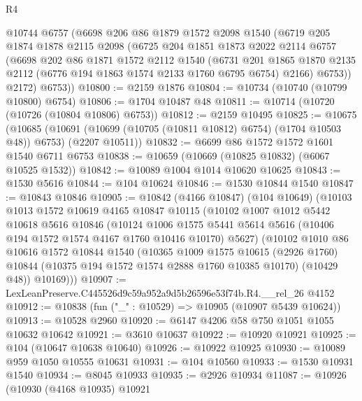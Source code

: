 \begin{lexlean}{R4}
\begin{coremodule}
      @10744
      @6757
      (@6698
        @206
        @86
        @1879
        @1572
        @2098
        @1540
        (@6719
          @205
          @1874
          @1878
          @2115
          @2098
          (@6725
            @204
            @1851
            @1873
            @2022
            @2114
            @6757
            (@6698
              @202
              @86
              @1871
              @1572
              @2112
              @1540
              (@6731
                @201
                @1865
                @1870
                @2135
                @2112
                (@6776 @194 @1863 @1574 @2133 @1760 @6795 @6754)
                @2166)
              @6753))
          @2172)
        @6753))
@10800 := @2159 @1876
@10804 := @10734 (@10740 (@10799 @10800) @6754)
@10806 := @1704 @10487 @48
@10811 := @10714 (@10720 (@10726 (@10804 @10806) @6753))
@10812 := @2159 @10495
@10825 := @10675
    (@10685
      (@10691 (@10699 (@10705 (@10811 @10812) @6754) (@1704 @10503 @48)) @6753)
      (@2207 @10511))
@10832 := @6699 @86 @1572 @1572 @1601 @1540 @6711 @6753
@10838 := @10659 (@10669 (@10825 @10832) (@6067 @10525 @1532))
@10842 := @10089 @1004 @1014 @10620 @10625
@10843 := @1530 @5616
@10844 := @104 @10624
@10846 := @1530 @10844 @1540
@10847 := @10843 @10846
@10905 := @10842
    (@4166 @10847)
    (@104 @10649)
    (@10103
      @1013
      @1572
      @10619
      @4165
      @10847
      @10115
      (@10102
        @1007
        @1012
        @5442
        @10618
        @5616
        @10846
        (@10124
          @1006
          @1575
          @5441
          @5614
          @5616
          (@10406 @194 @1572 @1574 @4167 @1760 @10416 @10170)
          @5627)
        (@10102
          @1010
          @86
          @10616
          @1572
          @10844
          @1540
          (@10365
            @1009
            @1575
            @10615
            (@2926 @1760)
            @10844
            (@10375 @194 @1572 @1574 @2888 @1760 @10385 @10170)
            (@10429 @48))
          @10169)))
@10907 := LexLeanPreserve.C445526d9c59a952a9d5b26596e53f74b.R4.__rel_26 @4152
@10912 := @10838 (fun ("_" : @10529) => @10905 (@10907 @5439 @10624))
@10913 := @10528 @2960
@10920 := @6147 @4206 @58 @750 @1051 @1055 @10632 @10642
@10921 := @3610 @10637
@10922 := @10920 @10921
@10925 := @104 (@10647 @10638 @10640)
@10926 := @10922 @10925
@10930 := @10089 @959 @1050 @10555 @10631
@10931 := @104 @10560
@10933 := @1530 @10931 @1540
@10934 := @8045 @10933
@10935 := @2926 @10934
@11087 := @10926
    (@10930
      (@4168 @10935)
      @10921

\end{coremodule}
\end{lexlean}
